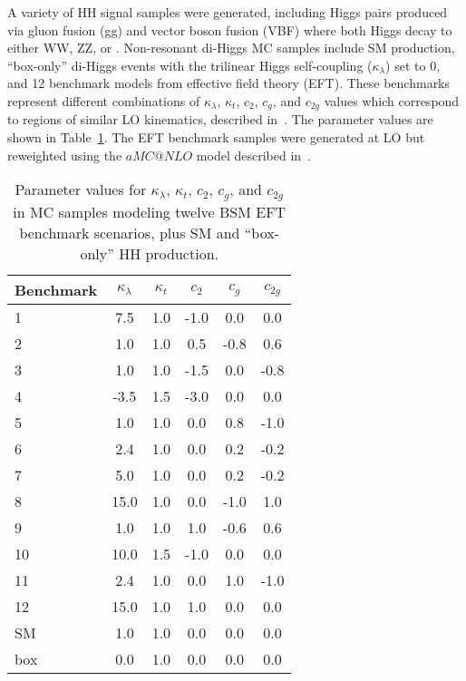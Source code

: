 A variety of HH signal samples were generated, including Higgs pairs produced via gluon
fusion (gg) and vector boson fusion (VBF) where both Higgs decay to either WW, ZZ, or \Pgt\Pgt.
Non-resonant di-Higgs MC samples include SM production, ``box-only'' di-Higgs events with
the trilinear Higgs self-coupling ($\kappa_{\lambda}$) set to 0, and 12 benchmark models
from effective field theory (EFT).  These benchmarks represent different combinations of
$\kappa_{\lambda}$, $\kappa_{t}$, $c_{2}$, $c_{g}$, and $c_{2g}$ values which correspond
to regions of similar LO kinematics, described in~\cite{Xandra:2016hhBM}.  The parameter
values are shown in Table~\ref{tab:HH_benchmarks}.  The EFT benchmark samples were
generated at LO but reweighted using the $aMC@NLO$ model described
in~\cite{Frixione:2011NLOQCD,Alwall:2014dcshh}.

\begin{table}[!h]
\begin{center}
\begin{tabular}{|l|c|c|c|c|c|} \hline
Benchmark & $\kappa_{\lambda}$  & $\kappa_{t}$ & $c_{2}$ & $c_{g}$ &  $c_{2g}$ \\
\hline
1         & 7.5                 & 1.0          & -1.0    & 0.0     & 0.0 \\
2         & 1.0                 & 1.0          &  0.5    & -0.8    & 0.6 \\
3         & 1.0                 & 1.0          & -1.5    & 0.0     & -0.8 \\
4         & -3.5                & 1.5          & -3.0    & 0.0     & 0.0 \\
5         & 1.0                 & 1.0          & 0.0     & 0.8     & -1.0 \\
6         & 2.4                 & 1.0          & 0.0     & 0.2     & -0.2 \\
7         & 5.0                 & 1.0          & 0.0     & 0.2     & -0.2 \\
8         & 15.0                & 1.0          & 0.0     & -1.0    & 1.0 \\
9         & 1.0                 & 1.0          & 1.0     & -0.6    & 0.6 \\
10         & 10.0                & 1.5          & -1.0    & 0.0     & 0.0 \\
11        & 2.4                 & 1.0          & 0.0     & 1.0     & -1.0 \\
12        & 15.0                & 1.0          & 1.0     & 0.0     & 0.0 \\
\hline
SM        & 1.0                 & 1.0          & 0.0     & 0.0     & 0.0 \\
box       & 0.0                 & 1.0          & 0.0     & 0.0     & 0.0 \\
\hline
\end{tabular}
\end{center}
\caption{
  Parameter values for $\kappa_{\lambda}$, $\kappa_{t}$, $c_{2}$, $c_{g}$, and
  $c_{2g}$ in MC samples modeling twelve BSM EFT benchmark scenarios, plus SM
  and ``box-only'' HH production.
}
\label{tab:HH_benchmarks}
\end{table}

